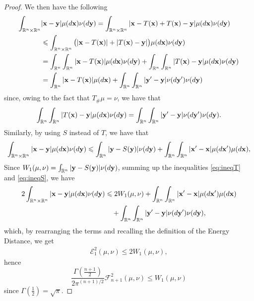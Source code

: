\documentclass{article}
\renewcommand{\le}{\leqslant}
\def\bx{{\bf x}}
\def\by{{\bf y}}
\def \erre{\mathbb{R}}
\newtheorem{proof}{Proof}
\begin{document}
\begin{proof}
    We then have the following 
    \begin{align}
    \label{eq:ineqT}
        \nonumber\int_{\erre^n\times\erre^n}&|\bx-\by|\mu(d\bx)\nu(d\by)=\int_{\erre^n\times\erre^n}|\bx-T(\bx)+T(\bx)-\by|\mu(d\bx)\nu(d\by)\\
        \nonumber&\le \int_{\erre^n\times\erre^n}\big(|\bx-T(\bx)|+|T(\bx)-\by|\big)\mu(d\bx)\nu(d\by)\\
        \nonumber&=\int_{\erre^n}\int_{\erre^n}|\bx-T(\bx)|\mu(d\bx)\nu(d\by)+\int_{\erre^n}\int_{\erre^n}|T(\bx)-\by|\mu(d\bx)\nu(d\by)\\
        &=\int_{\erre^n}|\bx-T(\bx)|\mu(d\bx)+\int_{\erre^n}\int_{\erre^n}|\by'-\by|\nu(d\by')\nu(d\by)
    \end{align}
    since, owing to the fact that $T_\#\mu=\nu$, we have that 
    \begin{equation}
        \int_{\erre^n}\int_{\erre^n}|T(\bx)-\by|\mu(d\bx)\nu(d\by)=\int_{\erre^n}\int_{\erre^n}|\by'-\by|\nu(d\by')\nu(d\by).
    \end{equation}
    Similarly, by using $S$ instead of $T$, we have that
    \begin{equation}
        \label{eq:ineqS}
        \int_{\erre^n\times\erre^n}|\bx-\by|\mu(d\bx)\nu(d\by)\le \int_{\erre^n}|\by-S(\by)|\nu(d\by)+\int_{\erre^n}\int_{\erre^n}|\bx'-\bx|\mu(d\bx')\mu(d\bx),    
    \end{equation}
    Since $W_1(\mu,\nu)=\int_{\erre^n}|\by-S(\by)|\nu(d\by)$, summing up the inequalities \eqref{eq:ineqT} and \eqref{eq:ineqS}, we have
    \begin{align}
        \label{eq:ineq_tot}
        \nonumber2\int_{\erre^n\times\erre^n}|\bx-\by|\mu(d\bx)\nu(d\by)&\le 2W_1(\mu,\nu)+\int_{\erre^n}\int_{\erre^n}|\bx'-\bx|\mu(d\bx')\mu(d\bx)\\
        &\quad+ \int_{\erre^n}\int_{\erre^n}|\by'-\by|\nu(d\by')\nu(d\by),
    \end{align}
    which, by rearranging the terms and recalling the definition of the Energy Distance, we get
    \begin{align}
        \mathcal{E}_1^2(\mu,\nu)\le 2W_1(\mu,\nu),
    \end{align}
    hence
    \begin{equation}
        \frac{\Gamma\left(\frac{n+1}2\right)}{2\pi^{(n+1)/2}}\mathcal{F}^2_{n+1}(\mu,\nu)\le W_1(\mu,\nu)
    \end{equation}
    since $\Gamma(\frac{1}{2})=\sqrt{\pi}$.
\end{proof}
\end{document}
